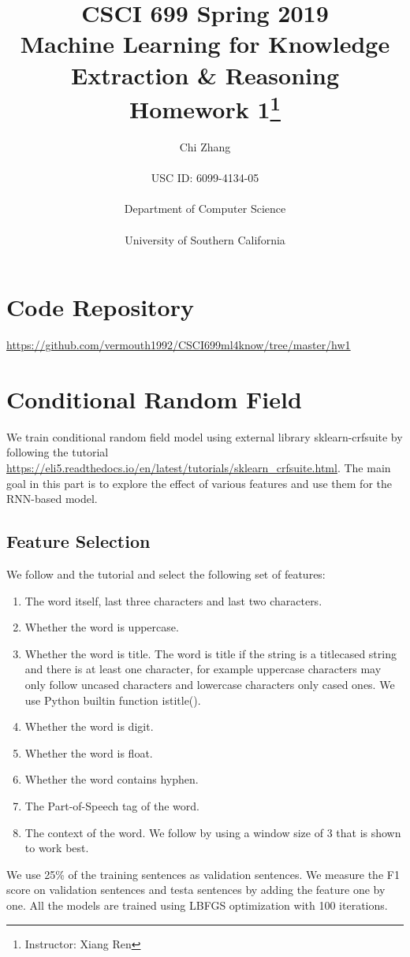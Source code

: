 \documentclass[a4paper]{article}
\author{Chi Zhang\\\\USC ID: 6099-4134-05\\\\Department of Computer Science\\\\University of Southern California}
\title{CSCI 699 Spring 2019\\Machine Learning for Knowledge Extraction \& Reasoning\\Homework 1\thanks{Instructor: Xiang Ren}}
\begin{document}
  \maketitle                     %
  \begin{spacing}{1.5}
 
  \section{Code Repository}
  \url{https://github.com/vermouth1992/CSCI699ml4know/tree/master/hw1}
 
  \section{Conditional Random Field}
  We train conditional random field model using external library sklearn-crfsuite \cite{sklearn_crfsuite} by following the tutorial \url{https://eli5.readthedocs.io/en/latest/tutorials/sklearn_crfsuite.html}. The main goal in this part is to explore the effect of various features and use them for the RNN-based model.
  \subsection{Feature Selection}
  We follow \cite{ner_features} and the tutorial and select the following set of features:
  \begin{enumerate}
    \item The word itself, last three characters and last two characters.
    \item Whether the word is uppercase.
    \item Whether the word is title. The word is title if the string is a titlecased string and there is at least one character, for example uppercase characters may only follow uncased characters and lowercase characters only cased ones. We use Python builtin function istitle().
    \item Whether the word is digit.
    \item Whether the word is float.
    \item Whether the word contains hyphen.
    \item The Part-of-Speech tag of the word.
    \item The context of the word. We follow \cite{ner_features} by using a window size of 3 that is shown to work best.
  \end{enumerate}

  We use 25\% of the training sentences as validation sentences. We measure the F1 score on validation sentences and testa sentences by adding the feature one by one. All the models are trained using LBFGS optimization with 100 iterations.


\end{spacing}
\end{document}
